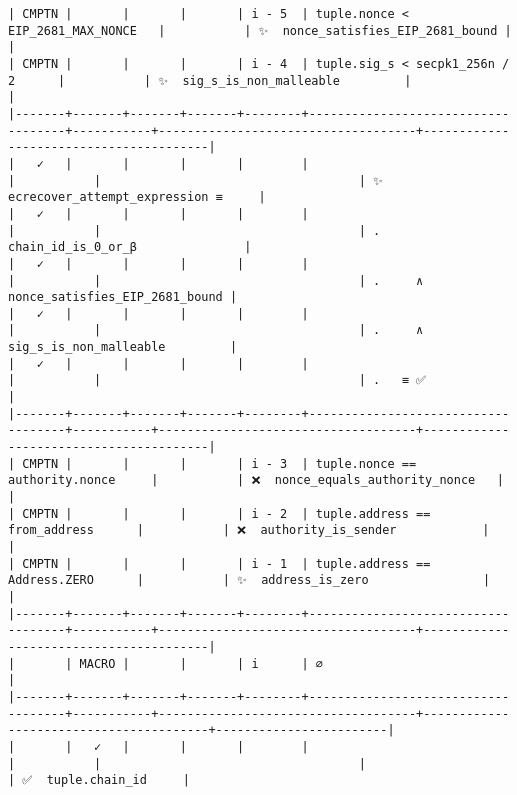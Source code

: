 \documentclass[varwidth=\maxdimen,margin=0.5cm,multi={verbatim}]{standalone}
\begin{document}
\begin{verbatim}
| CMPTN |       |       |       | i - 5  | tuple.nonce < EIP_2681_MAX_NONCE   |           | ✨  nonce_satisfies_EIP_2681_bound |                                        |
| CMPTN |       |       |       | i - 4  | tuple.sig_s < secpk1_256n / 2      |           | ✨  sig_s_is_non_malleable         |                                        |
|-------+-------+-------+-------+--------+------------------------------------+-----------+------------------------------------+----------------------------------------|
|   ✓   |       |       |       |        |                                    |           |                                    | ✨  ecrecover_attempt_expression ≡     |
|   ✓   |       |       |       |        |                                    |           |                                    | .     chain_id_is_0_or_β               |
|   ✓   |       |       |       |        |                                    |           |                                    | .     ∧ nonce_satisfies_EIP_2681_bound |
|   ✓   |       |       |       |        |                                    |           |                                    | .     ∧ sig_s_is_non_malleable         |
|   ✓   |       |       |       |        |                                    |           |                                    | .   ≡ ✅                               |
|-------+-------+-------+-------+--------+------------------------------------+-----------+------------------------------------+----------------------------------------|
| CMPTN |       |       |       | i - 3  | tuple.nonce == authority.nonce     |           | ❌  nonce_equals_authority_nonce   |                                        |
| CMPTN |       |       |       | i - 2  | tuple.address == from_address      |           | ❌  authority_is_sender            |                                        |
| CMPTN |       |       |       | i - 1  | tuple.address == Address.ZERO      |           | ✨  address_is_zero                |                                        |
|-------+-------+-------+-------+--------+------------------------------------+-----------+------------------------------------+----------------------------------------|
|       | MACRO |       |       | i      | ∅                                  |
|-------+-------+-------+-------+--------+------------------------------------+-----------+------------------------------------+----------------------------------------+------------------------|
|       |   ✓   |       |       |        |                                    |           |                                    |                                        | ✅  tuple.chain_id     |

\end{verbatim}
\end{document}
